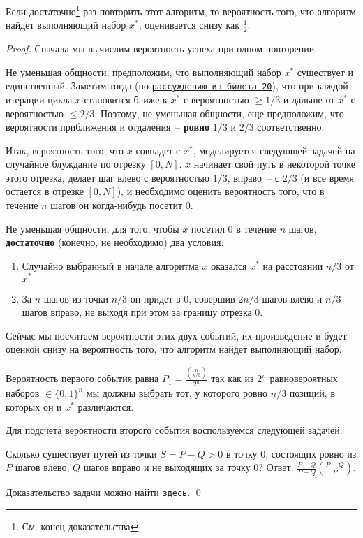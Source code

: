 \begin{theorem*}
    Если достаточно\footnote{См. конец доказательства} раз повторить этот алгоритм, то вероятность того, что алгоритм найдет выполняющий набор $x^*$, оценивается снизу как $\frac{1}{2}$.
\end{theorem*}
\begin{proof}
Сначала мы вычислим вероятность успеха при одном повторении.

Не уменьшая общности, предположим, что выполняющий набор $x^*$ существует и единственный. Заметим тогда (по \hyperlink{flip20}{\texttt{рассуждению из билета 20}}), что при каждой итерации цикла $x$ становится ближе к $x^*$ с вероятностью $\geq 1/3$ и дальше от $x^*$ с вероятностью $\leq 2/3$. Поэтому, не уменьшая общности, еще предположим, что вероятности приближения и отдаления~-- \textbf{ровно} $1/3$ и $2/3$ соответственно.

Итак, вероятность того, что $x$ совпадет с $x^*$, моделируется следующей задачей на случайное блуждание по отрезку $[0, N]$. $x$ начинает свой путь в некоторой точке этого отрезка, делает шаг влево с вероятностью $1/3$, вправо~-- с $2/3$ (и все время остается в отрезке $[0, N]$), и необходимо оценить вероятность того, что в течение $n$ шагов он когда-нибудь посетит 0.

Не уменьшая общности, для того, чтобы $x$ посетил 0 в течение $n$ шагов, \textbf{достаточно} (конечно, не необходимо) два условия:
\begin{enumerate}
    \item Случайно выбранный в начале алгоритма $x$ оказался $x^*$ на расстоянии $n/3$ от $x^*$
    \item За $n$ шагов из точки $n/3$ он придет в 0, совершив $2n/3$ шагов влево и $n/3$ шагов вправо, не выходя при этом за границу отрезка 0.
\end{enumerate}

Сейчас мы посчитаем вероятности этих двух событий, их произведение и будет оценкой снизу на вероятность того, что алгоритм найдет выполняющий набор.

Вероятность первого события равна $P_1 = \frac{{n\choose{n/3}}}{2^n}$ так как из $2^n$ равновероятных наборов $\in \{0, 1\}^n$ мы должны выбрать тот, у которого ровно $n/3$ позиций, в которых он и $x^*$ различаются.

Для подсчета вероятности второго события воспользуемся следующей задачей.

\begin{theorem*}
Сколько существует путей из точки $S=P-Q>0$ в точку $0$, состоящих ровно из $P$ шагов влево, $Q$ шагов вправо и не выходящих за точку 0? Ответ: $\frac{P-Q}{P+Q} {P+Q\choose P}$.
\end{theorem*}
Доказательство задачи можно найти \href{https://drive.google.com/file/d/1KaZ5K6OAp6HiJGrxcBXQsNTa5yug4_FE/view?usp=sharing}{\texttt{здесь}}. \qed


\end{proof}
